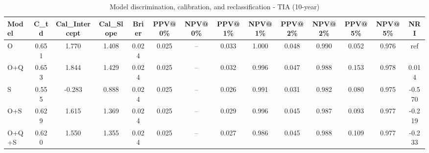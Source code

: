 \begin{table}[htbp]
\centering
\small
\caption{Model discrimination, calibration, and reclassification - TIA (10-year)}
\label{tab:perf_tia_10y}
\begin{tabular}{lccccccccccccc}
\toprule
Model & C\_td & Cal\_Intercept & Cal\_Slope & Brier & PPV@0\% & NPV@0\% & PPV@1\% & NPV@1\% & PPV@2\% & NPV@2\% & PPV@5\% & NPV@5\% & NRI \\
\midrule
O & 0.651 & 1.770 & 1.408 & 0.024 & 0.025 & -- & 0.033 & 1.000 & 0.048 & 0.990 & 0.052 & 0.976 & ref \\
O+Q & 0.653 & 1.844 & 1.429 & 0.024 & 0.025 & -- & 0.032 & 0.996 & 0.047 & 0.988 & 0.153 & 0.978 & 0.014 \\
S & 0.555 & -0.283 & 0.888 & 0.024 & 0.025 & -- & 0.026 & 0.991 & 0.031 & 0.982 & 0.080 & 0.975 & -0.570 \\
O+S & 0.629 & 1.615 & 1.369 & 0.024 & 0.025 & -- & 0.029 & 0.996 & 0.045 & 0.987 & 0.093 & 0.977 & -0.219 \\
O+Q+S & 0.620 & 1.550 & 1.355 & 0.024 & 0.025 & -- & 0.027 & 0.986 & 0.045 & 0.988 & 0.109 & 0.977 & -0.233 \\
\bottomrule
\end{tabular}
\end{table}
